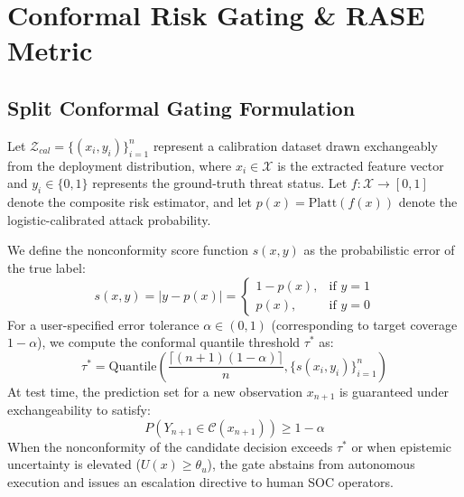 \documentclass[10pt,journal,compsoc]{IEEEtran}
\begin{document}
\section{Conformal Risk Gating \& RASE Metric}

\subsection{Split Conformal Gating Formulation}
Let $\mathcal{Z}_{cal} = \{(x_i, y_i)\}_{i=1}^n$ represent a calibration dataset drawn exchangeably from the deployment distribution, where $x_i \in \mathcal{X}$ is the extracted feature vector and $y_i \in \{0, 1\}$ represents the ground-truth threat status. Let $f: \mathcal{X} \rightarrow [0, 1]$ denote the composite risk estimator, and let $p(x) = \text{Platt}(f(x))$ denote the logistic-calibrated attack probability.

We define the nonconformity score function $s(x, y)$ as the probabilistic error of the true label:
\begin{equation}
s(x, y) = |y - p(x)| = \begin{cases} 1 - p(x), & \text{if } y = 1 \\ p(x), & \text{if } y = 0 \end{cases}
\end{equation}
For a user-specified error tolerance $\alpha \in (0, 1)$ (corresponding to target coverage $1 - \alpha$), we compute the conformal quantile threshold $\tau^*$ as:
\begin{equation}
\tau^* = \text{Quantile}\left( \frac{\lceil (n+1)(1-\alpha) \rceil}{n}, \{s(x_i, y_i)\}_{i=1}^n \right)
\end{equation}
At test time, the prediction set for a new observation $x_{n+1}$ is guaranteed under exchangeability to satisfy:
\begin{equation}
P(Y_{n+1} \in \mathcal{C}(x_{n+1})) \ge 1 - \alpha
\end{equation}
When the nonconformity of the candidate decision exceeds $\tau^*$ or when epistemic uncertainty is elevated ($U(x) \ge \theta_u$), the gate abstains from autonomous execution and issues an escalation directive to human SOC operators.
\end{document}
